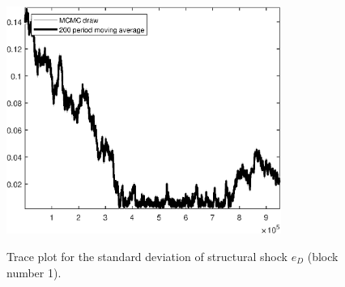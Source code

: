 \begin{figure}[H]
\centering
  \includegraphics[width=0.8\textwidth]{BRS_growth_util_sectoral/graphs/TracePlot_SE_e_D_blck_1}\\
    \caption{Trace plot for the standard deviation of structural shock ${e_D}$ (block number 1).}
\end{figure}
